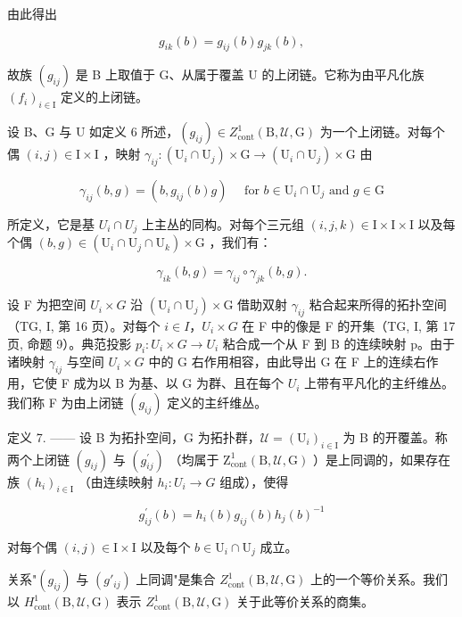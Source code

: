 由此得出

\[
g _ {i k} (b) = g _ {i j} (b) g _ {j k} (b),
\]

故族 \((g_{ij})\) 是 B 上取值于 G、从属于覆盖 U 的上闭链。它称为由平凡化族 \((f_{i})_{i\in\mathrm{I}}\) 定义的上闭链。

设 B、G 与 U 如定义 6 所述，\((g_{ij}) \in Z_{\mathrm{cont}}^{1}(\mathrm{B}, \mathcal{U}, \mathrm{G})\) 为一个上闭链。对每个偶 \((i, j) \in \mathrm{I} \times \mathrm{I}\) ，映射 \(\gamma_{ij} \colon (\mathrm{U}_{i} \cap \mathrm{U}_{j}) \times \mathrm{G} \to (\mathrm{U}_{i} \cap \mathrm{U}_{j}) \times \mathrm{G}\) 由

\[
\gamma_ {i j} (b, g) = \left(b, g _ {i j} (b) g\right) \quad \text {   for   } b \in \mathrm{U} _ {i} \cap \mathrm{U} _ {j} \text {   and   } g \in \mathrm{G}\tag{5}
\]

所定义，它是基 \(U_{i} \cap U_{j}\) 上主丛的同构。对每个三元组 \((i,j,k) \in \mathrm{I} \times \mathrm{I} \times \mathrm{I}\) 以及每个偶 \((b,g) \in (\mathrm{U}_{i} \cap \mathrm{U}_{j} \cap \mathrm{U}_{k}) \times \mathrm{G}\) ，我们有：

\[
\gamma_ {i k} (b, g) = \gamma_ {i j} \circ \gamma_ {j k} (b, g).
\]

设 F 为把空间 \(U_{i} \times G\) 沿 \((\mathrm{U}_{i} \cap \mathrm{U}_{j}) \times \mathrm{G}\) 借助双射 \(\gamma_{ij}\) 粘合起来所得的拓扑空间（TG, I, 第 16 页）。对每个 \(i \in I\)，\(U_{i} \times G\) 在 F 中的像是 F 的开集（TG, I, 第 17 页, 命题 9）。典范投影 \(p_{i}: U_{i} \times G \to U_{i}\) 粘合成一个从 F 到 B 的连续映射 p。由于诸映射 \(\gamma_{ij}\) 与空间 \(U_{i} \times G\) 中的 G 右作用相容，由此导出 G 在 F 上的连续右作用，它使 F 成为以 B 为基、以 G 为群、且在每个 \(U_{i}\) 上带有平凡化的主纤维丛。我们称 F 为由上闭链 \((g_{ij})\) 定义的主纤维丛。

定义 7. —— 设 B 为拓扑空间，G 为拓扑群，\(\mathcal{U} = (\mathrm{U}_{i})_{i\in \mathrm{I}}\) 为 B 的开覆盖。称两个上闭链 \((g_{ij})\) 与 \((g_{ij}^{\prime})\) （均属于 \(\mathrm{Z}_{\mathrm{cont}}^{1}(\mathrm{B},\mathcal{U},\mathrm{G})\) ）是上同调的，如果存在族 \((h_{i})_{i\in\mathrm{I}}\) （由连续映射 \(h_{i}\colon U_{i}\to G\) 组成），使得

\[
g _ {i j} ^ {\prime} (b) = h _ {i} (b) g _ {i j} (b) h _ {j} (b) ^ {- 1}\tag{6}
\]

对每个偶 \((i,j)\in \mathrm{I}\times \mathrm{I}\) 以及每个 \(b\in \mathrm{U}_i\cap \mathrm{U}_j\) 成立。

关系"\((g_{ij})\) 与 \((g'_{ij})\) 上同调"是集合 \(Z_{\mathrm{cont}}^{1}(\mathrm{B},\mathcal{U},\mathrm{G})\) 上的一个等价关系。我们以 \(H_{\mathrm{cont}}^{1}(\mathrm{B},\mathcal{U},\mathrm{G})\) 表示 \(Z_{\mathrm{cont}}^{1}(\mathrm{B},\mathcal{U},\mathrm{G})\) 关于此等价关系的商集。

